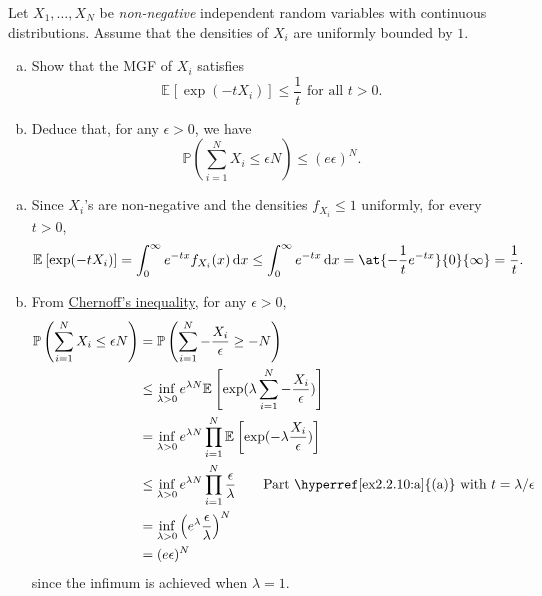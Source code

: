 \begin{problem*}[Exercise 2.2.10]\label{ex2.2.10}
	Let \(X_1, \dots , X_N\) be \emph{non-negative} independent random variables with continuous distributions. Assume that the densities of \(X_i\) are uniformly bounded by \(1\).
	\begin{enumerate}[(a)]
		\item\label{ex2.2.10:a} Show that the MGF of \(X_i\) satisfies
		      \[
			      \mathbb{E}_{}[\exp (- tX_i)]
			      \leq \frac{1}{t}
			      \text{ for all } t > 0.
		      \]
		\item\label{ex2.2.10:b} Deduce that, for any \(\epsilon > 0\), we have
		      \[
			      \mathbb{P} \left( \sum_{i=1}^{N} X_i \leq \epsilon N \right)
			      \leq (e \epsilon )^N.
		      \]
	\end{enumerate}
\end{problem*}
\begin{answer}
	\begin{enumerate}[(a)]
		\item Since \(X_i\)'s are non-negative and the densities \(f_{X_i} \leq 1\) uniformly, for every \(t > 0\),
		      \[
			      \mathbb{E}_{}\left[\exp (-t X_i) \right]
			      = \int_{0}^{\infty} e^{-t x} f_{X_i}(x) \,\mathrm{d}x
			      \leq \int_{0}^{\infty} e^{-t x} \,\mathrm{d}x
			      = \at{-\frac{1}{t} e^{-tx}}{0}{\infty }
			      = \frac{1}{t}.
		      \]
		\item From \hyperref[lma:Crarmer-Chernoff]{Chernoff's inequality}, for any \(\epsilon > 0\),
		      \begin{align*}
			      \mathbb{P} \left( \sum_{i=1}^{N} X_i \leq \epsilon N \right)
			       & = \mathbb{P} \left( \sum_{i=1}^{N} - \frac{X_i}{\epsilon } \geq -N \right)                                                                                                                        \\
			       & \leq \inf _{\lambda > 0} e^{\lambda N} \mathbb{E}_{}\left[ \exp (\lambda \sum_{i=1}^{N} - \frac{X_i}{\epsilon } ) \right]                                                                         \\
			       & = \inf _{\lambda > 0} e^{\lambda N} \prod_{i=1}^{N} \mathbb{E}_{}\left[ \exp ( - \lambda \frac{X_i}{\epsilon } ) \right]                                                                          \\
			       & \leq \inf _{\lambda > 0} e^{\lambda N} \prod_{i=1}^{N} \frac{\epsilon}{\lambda }                                          \tag*{Part \hyperref[ex2.2.10:a]{(a)} with \(t = \lambda / \epsilon \)} \\
			       & = \inf _{\lambda >0} \left( e^\lambda \frac{\epsilon}{\lambda } \right) ^N                                                                                                                        \\
			       & = (e \epsilon )^N
		      \end{align*}
		      since the infimum is achieved when \(\lambda = 1\).
	\end{enumerate}
\end{answer}

